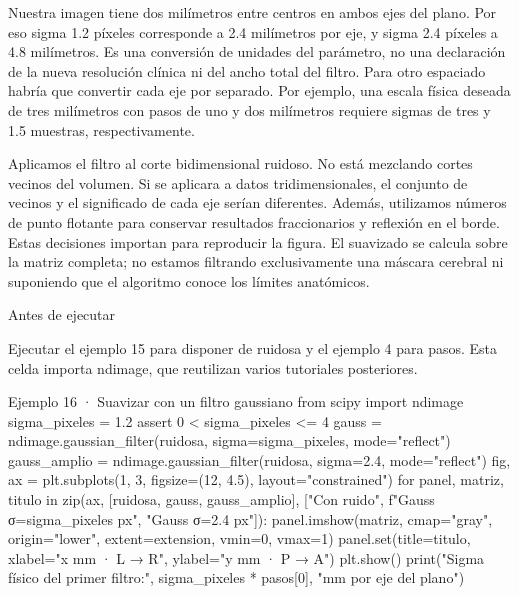 Nuestra imagen tiene dos milímetros entre centros en ambos ejes del plano. Por eso sigma 1.2 píxeles corresponde a 2.4 milímetros por eje, y sigma 2.4 píxeles a 4.8 milímetros. Es una conversión de unidades del parámetro, no una declaración de la nueva resolución clínica ni del ancho total del filtro. Para otro espaciado habría que convertir cada eje por separado. Por ejemplo, una escala física deseada de tres milímetros con pasos de uno y dos milímetros requiere sigmas de tres y 1.5 muestras, respectivamente.


Aplicamos el filtro al corte bidimensional ruidoso. No está mezclando cortes vecinos del volumen. Si se aplicara a datos tridimensionales, el conjunto de vecinos y el significado de cada eje serían diferentes. Además, utilizamos números de punto flotante para conservar resultados fraccionarios y reflexión en el borde. Estas decisiones importan para reproducir la figura. El suavizado se calcula sobre la matriz completa; no estamos filtrando exclusivamente una máscara cerebral ni suponiendo que el algoritmo conoce los límites anatómicos.



\begin{Idea}{Antes de ejecutar}

Ejecutar el ejemplo 15 para disponer de ruidosa y el ejemplo 4 para pasos. Esta celda importa ndimage, que reutilizan varios tutoriales posteriores.


\end{Idea}

\begin{Codigo}{Ejemplo 16 · Suavizar con un filtro gaussiano}
from scipy import ndimage
sigma_pixeles = 1.2
assert 0 < sigma_pixeles <= 4
gauss = ndimage.gaussian_filter(ruidosa, sigma=sigma_pixeles, mode="reflect")
gauss_amplio = ndimage.gaussian_filter(ruidosa, sigma=2.4, mode="reflect")
fig, ax = plt.subplots(1, 3, figsize=(12, 4.5), layout="constrained")
for panel, matriz, titulo in zip(ax, [ruidosa, gauss, gauss_amplio], ["Con ruido", f"Gauss σ={sigma_pixeles} px", "Gauss σ=2.4 px"]):
    panel.imshow(matriz, cmap="gray", origin="lower", extent=extension, vmin=0, vmax=1)
    panel.set(title=titulo, xlabel="x mm · L → R", ylabel="y mm · P → A")
plt.show()
print("Sigma físico del primer filtro:", sigma_pixeles * pasos[0], "mm por eje del plano")
\end{Codigo}


